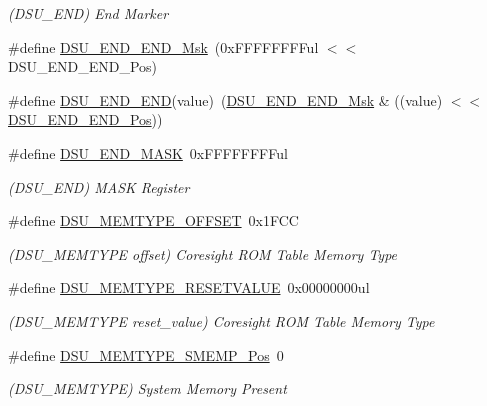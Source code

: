 \begin{DoxyCompactItemize}
\begin{DoxyCompactList}\small\item\em (D\+S\+U\+\_\+\+E\+ND) End Marker \end{DoxyCompactList}\item 
\#define \mbox{\hyperlink{group___s_a_m_d21___d_s_u_gaaf87e985a2898109e146e505e1bc603e}{D\+S\+U\+\_\+\+E\+N\+D\+\_\+\+E\+N\+D\+\_\+\+Msk}}~(0x\+F\+F\+F\+F\+F\+F\+F\+Ful $<$$<$ D\+S\+U\+\_\+\+E\+N\+D\+\_\+\+E\+N\+D\+\_\+\+Pos)
\item 
\#define \mbox{\hyperlink{group___s_a_m_d21___d_s_u_ga7f75f47734b0964eae647d11b91f7748}{D\+S\+U\+\_\+\+E\+N\+D\+\_\+\+E\+ND}}(value)~(\mbox{\hyperlink{group___s_a_m_d21___d_s_u_gaaf87e985a2898109e146e505e1bc603e}{D\+S\+U\+\_\+\+E\+N\+D\+\_\+\+E\+N\+D\+\_\+\+Msk}} \& ((value) $<$$<$ \mbox{\hyperlink{group___s_a_m_d21___d_s_u_ga490d2f02762f42681fc4dcaa0db570bb}{D\+S\+U\+\_\+\+E\+N\+D\+\_\+\+E\+N\+D\+\_\+\+Pos}}))
\item 
\#define \mbox{\hyperlink{group___s_a_m_d21___d_s_u_gac1fdb41335952f536cc506c75a0f2e5f}{D\+S\+U\+\_\+\+E\+N\+D\+\_\+\+M\+A\+SK}}~0x\+F\+F\+F\+F\+F\+F\+F\+Ful
\begin{DoxyCompactList}\small\item\em (D\+S\+U\+\_\+\+E\+ND) M\+A\+SK Register \end{DoxyCompactList}\item 
\#define \mbox{\hyperlink{group___s_a_m_d21___d_s_u_ga9cfb1a386c96d79aa14d0556e89a9847}{D\+S\+U\+\_\+\+M\+E\+M\+T\+Y\+P\+E\+\_\+\+O\+F\+F\+S\+ET}}~0x1\+F\+CC
\begin{DoxyCompactList}\small\item\em (D\+S\+U\+\_\+\+M\+E\+M\+T\+Y\+PE offset) Coresight R\+OM Table Memory Type \end{DoxyCompactList}\item 
\#define \mbox{\hyperlink{group___s_a_m_d21___d_s_u_gae696aac50623781af5c363bb4819a651}{D\+S\+U\+\_\+\+M\+E\+M\+T\+Y\+P\+E\+\_\+\+R\+E\+S\+E\+T\+V\+A\+L\+UE}}~0x00000000ul
\begin{DoxyCompactList}\small\item\em (D\+S\+U\+\_\+\+M\+E\+M\+T\+Y\+PE reset\+\_\+value) Coresight R\+OM Table Memory Type \end{DoxyCompactList}\item 
\#define \mbox{\hyperlink{group___s_a_m_d21___d_s_u_gaf9e3cd3a0a5383eb7790554b6b26b2d3}{D\+S\+U\+\_\+\+M\+E\+M\+T\+Y\+P\+E\+\_\+\+S\+M\+E\+M\+P\+\_\+\+Pos}}~0
\begin{DoxyCompactList}\small\item\em (D\+S\+U\+\_\+\+M\+E\+M\+T\+Y\+PE) System Memory Present \end{DoxyCompactList}\item 

\end{DoxyCompactItemize}
